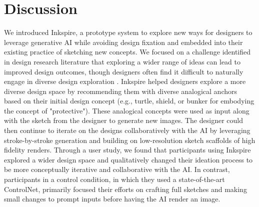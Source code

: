\documentclass[sigconf, screen]{acmart}
\begin{document}




\section{Discussion}

We introduced Inkspire, a prototype system to explore new ways for designers to leverage generative AI while avoiding design fixation and embedded into their existing practice of sketching new concepts. 
We focused on a challenge identified in design research literature that exploring a wider range of ideas can lead to improved design outcomes, though designers often find it difficult to naturally engage in diverse design exploration \cite{dow2010parallel, kocienda2018creative}.
Inkspire helped designers explore a more diverse design space by recommending them with diverse analogical anchors based on their initial design concept (e.g., turtle, shield, or bunker for embodying the concept of "protective").
These analogical concepts were used as input along with the sketch from the designer to generate new images. The designer could then continue to iterate on the designs collaboratively with the AI by leveraging stroke-by-stroke generation and building on low-resolution sketch scaffolds of high fidelity renders.
Through a user study, we found that participants using Inkspire explored a wider design space and qualitatively changed their ideation process to be more conceptually iterative and collaborative with the AI. In contrast, participants in a control condition, in which they used a state-of-the-art ControlNet, primarily focused their efforts on crafting full sketches and making small changes to prompt inputs before having the AI render an image.
\end{document}
